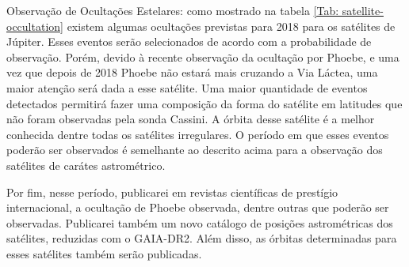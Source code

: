 \documentclass[12pt,a4paper]{report}
\begin{document}
Observação de Ocultações Estelares: como mostrado na tabela \ref{Tab: satellite-occultation} existem algumas ocultações previstas para 2018 para os satélites de Júpiter. Esses eventos serão selecionados de acordo com a probabilidade de observação. Porém, devido à recente observação da ocultação por Phoebe, e uma vez que depois de 2018 Phoebe não estará mais cruzando a Via Láctea, uma maior atenção será dada a esse satélite. Uma maior quantidade de eventos detectados permitirá fazer uma composição da forma do satélite em latitudes que não foram observadas pela sonda Cassini. A órbita desse satélite é a melhor conhecida dentre todas os satélites irregulares. O período em que esses eventos poderão ser observados é semelhante ao descrito acima para a observação dos satélites de carátes astrométrico.

Por fim, nesse período, publicarei em revistas científicas de prestígio internacional, a ocultação de Phoebe observada, dentre outras que poderão ser observadas. Publicarei também um novo catálogo de posições astrométricas dos satélites, reduzidas com o GAIA-DR2. Além disso, as órbitas determinadas para esses satélites também serão publicadas.



\end{document}
